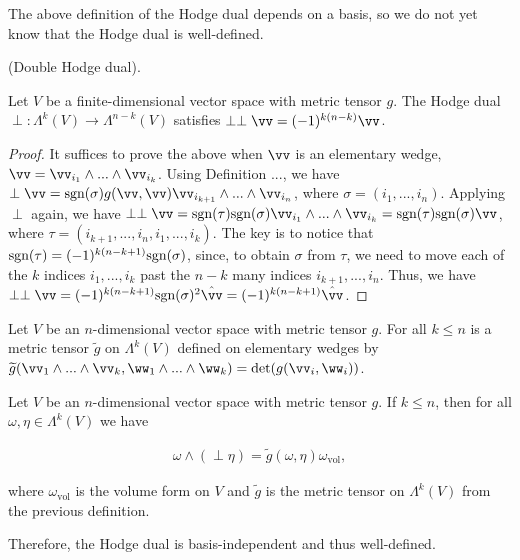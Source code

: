 \begin{remark}
    The above definition of the Hodge dual depends on a basis, so we do not yet know that the Hodge dual is well-defined.
\end{remark}

\begin{theorem}
    (Double Hodge dual).
    
    Let $V$ be a finite-dimensional vector space with metric tensor $g$. The Hodge dual $\perp:\Lambda^k(V) \rightarrow \Lambda^{n - k}(V)$ satisfies $\perp \perp \vv = (-1)^{k(n - k)} \vv$.
\end{theorem}

\begin{proof}
    It suffices to prove the above when $\vv$ is an elementary wedge, $\vv = \vv_{i_1} \wedge ... \wedge \vv_{i_k}$. Using Definition ..., we have $\perp \vv = \sgn(\sigma) g(\vv, \vv) \vv_{i_{k + 1}} \wedge ... \wedge \vv_{i_n}$, where $\sigma = (i_1, ..., i_n)$. Applying $\perp$ again, we have $\perp \perp \vv = \sgn(\tau) \sgn(\sigma) \vv_{i_1} \wedge ... \wedge \vv_{i_k} = \sgn(\tau) \sgn(\sigma) \vv$, where $\tau = (i_{k + 1}, ..., i_n, i_1, ..., i_k)$. The key is to notice that $\text{sgn}(\tau) = (-1)^{k(n - k + 1)} \text{sgn}(\sigma)$, since, to obtain $\sigma$ from $\tau$, we need to move each of the $k$ indices $i_1, ..., i_k$ past the $n - k$ many indices $i_{k + 1}, ..., i_n$. Thus, we have $\perp \perp \vv = (-1)^{k(n - k + 1)} \sgn(\sigma)^2 \hvv = (-1)^{k(n - k + 1)} \hvv$.
\end{proof}

\begin{theorem}
    Let $V$ be an $n$-dimensional vector space with metric tensor $g$. For all $k \leq n$ is a metric tensor $\widetilde{g}$ on $\Lambda^k(V)$ defined on elementary wedges by     $\widetilde{g}(\vv_1 \wedge ... \wedge \vv_k, \ww_1 \wedge ... \wedge \ww_k) = \det(g(\vv_i, \ww_i))$.
\end{theorem}

\begin{theorem}
    Let $V$ be an $n$-dimensional vector space with metric tensor $g$. If $k \leq n$, then for all $\omega, \eta \in \Lambda^k(V)$ we have

    \begin{align*}
        \omega \wedge (\perp \eta) = \widetilde{g}(\omega, \eta) \omega_{\text{vol}},
    \end{align*}
    
    where $\omega_{\text{vol}}$ is the volume form on $V$ and $\widetilde{g}$ is the metric tensor on $\Lambda^k(V)$ from the previous definition.
    
    Therefore, the Hodge dual is basis-independent and thus well-defined.
\end{theorem}

